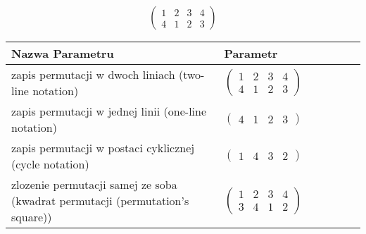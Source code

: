 \documentclass[12pt]{article}
\begin{document}
\subsection{}
\begin{center}
\[
\begin{pmatrix}
	1 & 2 & 3 & 4 \\ 
	4 & 1 & 2 & 3 
\end{pmatrix}
\]

\begin{tabular}{|m{0.6\linewidth}|m{0.4\linewidth}|}
	\hline
	Nazwa Parametru & Parametr \\
	\hline
	zapis permutacji w dwoch liniach (two-line notation) & $\begin{pmatrix} 1 & 2 & 3 & 4 \\ 
4 & 1 & 2 & 3 \end{pmatrix}$ \\ 
	\hline
	zapis permutacji w jednej linii (one-line notation) & $\begin{pmatrix} 4 & 1 & 2 & 3 \end{pmatrix}$ \\ 
	\hline
	zapis permutacji w postaci cyklicznej (cycle notation) & $\begin{pmatrix} 1 & 4 & 3 & 2 \end{pmatrix} $ \\ 
	\hline
	zlozenie permutacji samej ze soba (kwadrat permutacji (permutation's square)) & $\begin{pmatrix} 1 & 2 & 3 & 4 \\ 
3 & 4 & 1 & 2 \end{pmatrix}$ \\ 
	\hline
\end{tabular}
\end{center}
\end{document}
